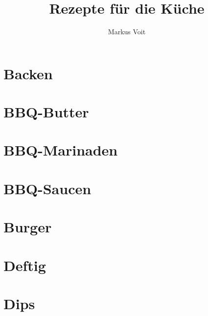 \documentclass[
  DIV=11,%
  pagesize,%
  fontsize=11pt,%
  paper=a4,%
  numbers=noenddot,
]{scrartcl}
\title{Rezepte für die Küche}
\author{Markus Voit}
\begin{document}
\maketitle
\clearpage

\tableofcontents
\clearpage

\section{Backen}
\newpage
\newpage

\section{BBQ-Butter}
\newpage
\newpage
\newpage
\newpage
\newpage

\section{BBQ-Marinaden}
\newpage
\newpage
\newpage

\section{BBQ-Saucen}
\newpage
\newpage
\newpage
\newpage
\newpage
\newpage

\section{Burger}
\newpage
\newpage

\section{Deftig}
\newpage
\newpage

\section{Dips}
\newpage
\end{document}
